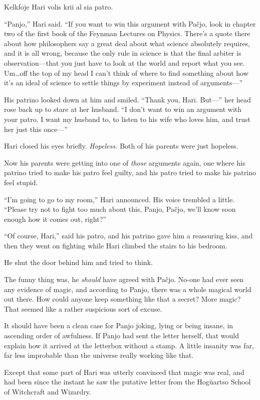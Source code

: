 Kelkfoje Hari volis krii al sia patro.

“Panjo,” Hari said. “If you want to win this argument with Paĉjo, look in chapter two of the first book of the Feynman Lectures on Physics. There’s a quote there about how philosophers say a great deal about what science absolutely requires, and it is all wrong, because the only rule in science is that the final arbiter is observation—that you just have to look at the world and report what you see. Um…off the top of my head I can’t think of where to find something about how it’s an ideal of science to settle things by experiment instead of arguments—”

His patrino looked down at him and smiled. “Thank you, Hari. But—” her head rose back up to stare at her husband. “I don’t want to win an argument with your patro. I want my husband to, to listen to his wife who loves him, and trust her just this once—”

Hari closed his eyes briefly. \emph{Hopeless.} Both of his parents were just hopeless.

Now his parents were getting into one of \emph{those} arguments again, one where his patrino tried to make his patro feel guilty, and his patro tried to make his patrino feel stupid.

“I’m going to go to my room,” Hari announced. His voice trembled a little. “Please try not to fight too much about this, Panjo, Paĉjo, we’ll know soon enough how it comes out, right?”

“Of course, Hari,” said his patro, and his patrino gave him a reassuring kiss, and then they went on fighting while Hari climbed the stairs to his bedroom.

He shut the door behind him and tried to think.

The funny thing was, he \emph{should} have agreed with Paĉjo. No-one had ever seen any evidence of magic, and according to Panjo, there was a whole magical world out there. How could anyone keep something like that a secret? More magic? That seemed like a rather suspicious sort of excuse.

It should have been a clean case for Panjo joking, lying or being insane, in ascending order of awfulness. If Panjo had sent the letter herself, that would explain how it arrived at the letterbox without a stamp. A little insanity was far, far less improbable than the universe really working like that.

Except that some part of Hari was utterly convinced that magic was real, and had been since the instant he saw the putative letter from the Hogŭartso School of Witchcraft and Wizardry.

